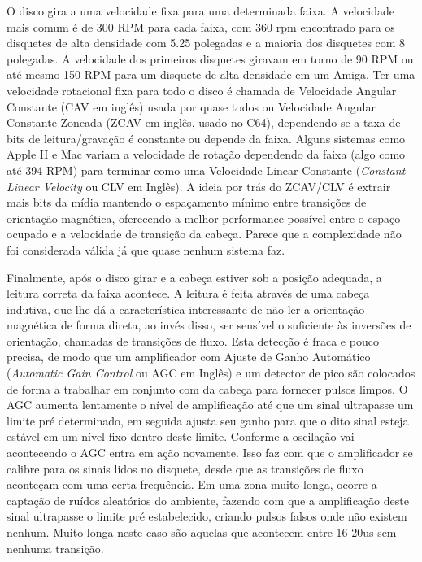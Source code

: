 \documentclass[letterpaper,10pt,brazil]{sphinxmanual}
\begin{document}
O disco gira a uma velocidade fixa para uma determinada faixa.
A velocidade mais comum é de 300 RPM para cada faixa, com 360 rpm
encontrado para os disquetes de alta densidade com 5.25 polegadas e a
maioria dos disquetes com 8 polegadas. A velocidade dos primeiros
disquetes giravam em torno de 90 RPM ou até mesmo 150 RPM para um
disquete de alta densidade em um Amiga. Ter uma velocidade rotacional
fixa para todo o disco é chamada de Velocidade Angular Constante
(CAV em inglês) usada por quase todos ou Velocidade Angular Constante
Zoneada (ZCAV em inglês, usado no C64), dependendo se a taxa de bits de
leitura/gravação é constante ou depende da faixa. Alguns sistemas como
Apple II e Mac variam a velocidade de rotação dependendo da faixa (algo
como até 394 RPM) para terminar como uma Velocidade Linear Constante
(\emph{Constant Linear Velocity} ou CLV em Inglês). A ideia por trás do
ZCAV/CLV é extrair mais bits da mídia mantendo o espaçamento mínimo
entre transições de orientação magnética, oferecendo a melhor
performance possível entre o espaço ocupado e a velocidade de transição
da cabeça. Parece que a complexidade não foi considerada válida já que
quase nenhum sistema faz.

Finalmente, após o disco girar e a cabeça estiver sob a posição
adequada, a leitura correta da faixa acontece. A leitura é feita através
de uma cabeça indutiva, que lhe dá a característica interessante de não
ler a orientação magnética de forma direta, ao invés disso, ser sensível
o suficiente às inversões de orientação, chamadas de transições de
fluxo. Esta detecção é fraca e pouco precisa, de modo que um
amplificador com Ajuste de Ganho Automático (\emph{Automatic Gain Control}
ou AGC em Inglês) e um detector de pico são colocados de forma a
trabalhar em conjunto com da cabeça para fornecer pulsos limpos.
O AGC aumenta lentamente o nível de amplificação até que um sinal
ultrapasse um limite pré determinado, em seguida ajusta seu ganho para
que o dito sinal esteja estável em um nível fixo dentro deste limite.
Conforme a oscilação vai acontecendo o AGC entra em ação novamente.
Isso faz com que o amplificador se calibre para os sinais lidos no
disquete, desde que as transições de fluxo aconteçam com uma certa
frequência. Em uma zona muito longa, ocorre a captação de ruídos
aleatórios do ambiente, fazendo com que a amplificação deste sinal
ultrapasse o limite pré estabelecido, criando pulsos falsos onde não
existem nenhum. Muito longa neste caso são aquelas que acontecem entre
16-20us sem nenhuma transição.
\end{document}
